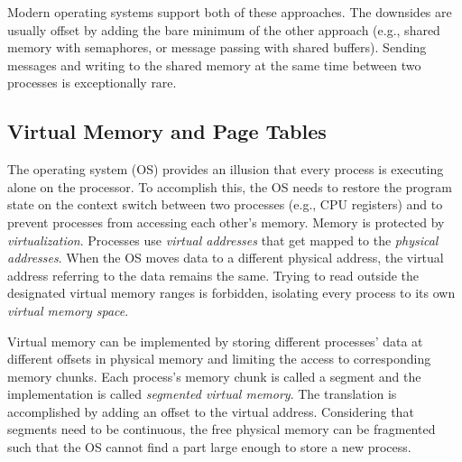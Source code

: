 Modern operating systems support both of these approaches. The downsides are
usually offset by adding the  bare minimum of the other approach (e.g., shared
memory with semaphores, or message passing with shared buffers). Sending
messages and writing to the shared memory at the same time between two processes
is exceptionally rare.

\subsection{Virtual Memory and Page Tables} \label{subsec:vm}

The operating system (OS) provides an illusion that every process is executing
alone on the processor. To accomplish this, the OS needs to restore the program
state on the context switch between two processes (e.g., CPU registers) and to
prevent processes from accessing each other's memory. Memory is protected by
\emph{virtualization}. Processes use \emph{virtual addresses} that get mapped to
the \emph{physical addresses}. When the OS moves data to a different physical
address, the virtual address referring to the data remains the same. Trying to
read outside the designated virtual memory ranges is forbidden, isolating every
process to its own \emph{virtual memory space}.

Virtual memory can be implemented by storing different processes' data at 
different offsets in physical memory and limiting the access to corresponding 
memory chunks. Each process's memory chunk is called a segment and the 
implementation is called \emph{segmented virtual memory}. The translation is 
accomplished by adding an offset to the virtual address. Considering that 
segments need to be continuous, the free physical memory can be fragmented
such that the OS cannot find a part large enough to store a new process.

